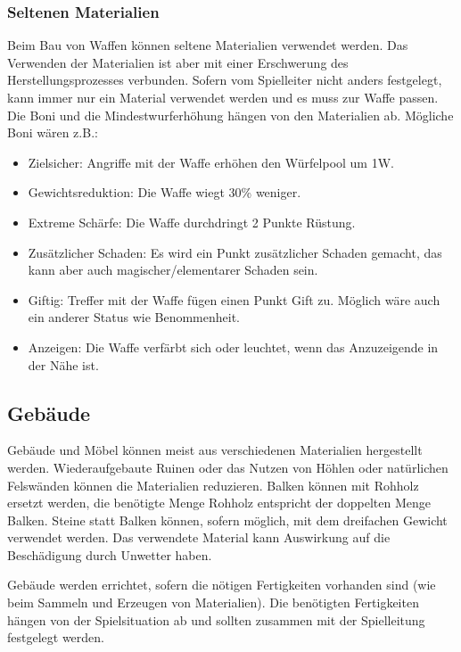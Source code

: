 \documentclass{article}
\begin{document}
\subsubsection{Seltenen Materialien}

Beim Bau von Waffen können seltene Materialien verwendet werden. Das Verwenden der Materialien ist aber mit einer
Erschwerung des Herstellungsprozesses verbunden. Sofern vom Spielleiter nicht anders festgelegt, kann immer nur ein
Material verwendet werden und es muss zur Waffe passen. Die Boni und die Mindestwurferhöhung hängen von den
Materialien ab. Mögliche Boni wären z.B.:

\begin{itemize}
\item Zielsicher: Angriffe mit der Waffe erhöhen den Würfelpool um 1W.
\item Gewichtsreduktion: Die Waffe wiegt 30\% weniger.
\item Extreme Schärfe: Die Waffe durchdringt 2 Punkte Rüstung.
\item Zusätzlicher Schaden: Es wird ein Punkt zusätzlicher Schaden gemacht, das kann aber auch magischer/elementarer Schaden sein.
\item Giftig: Treffer mit der Waffe fügen einen Punkt Gift zu. Möglich wäre auch ein anderer Status wie Benommenheit.
\item Anzeigen: Die Waffe verfärbt sich oder leuchtet, wenn das Anzuzeigende in der Nähe ist.
\end{itemize}

\begin{center}
\subsection{Gebäude}
\end{center}

Gebäude und Möbel können meist aus verschiedenen Materialien hergestellt werden. Wiederaufgebaute Ruinen oder das
Nutzen von Höhlen oder natürlichen Felswänden können die Materialien reduzieren. Balken können mit Rohholz ersetzt
werden, die benötigte Menge Rohholz entspricht der doppelten Menge Balken. Steine statt Balken können, sofern möglich,
mit dem dreifachen Gewicht verwendet werden. Das verwendete Material kann Auswirkung auf die Beschädigung durch Unwetter
haben.

Gebäude werden errichtet, sofern die nötigen Fertigkeiten vorhanden sind (wie beim Sammeln und Erzeugen von Materialien).
Die benötigten Fertigkeiten hängen von der Spielsituation ab und sollten zusammen mit der Spielleitung festgelegt
werden.
\end{document}
